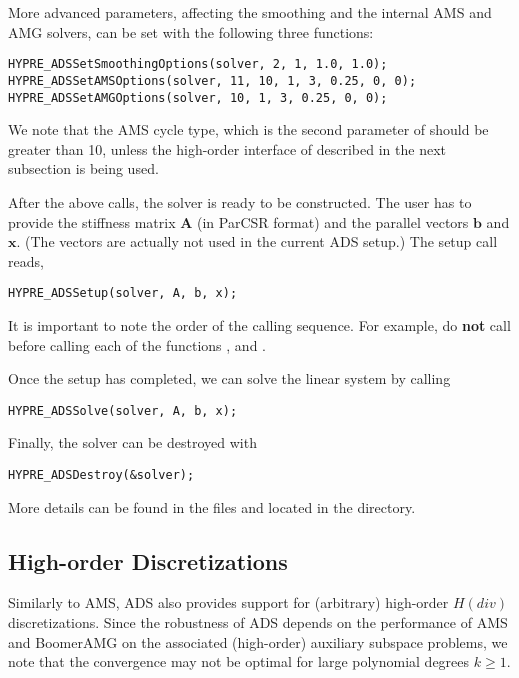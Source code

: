 More advanced parameters, affecting the smoothing and the internal AMS and AMG
 solvers, can be set with the following three functions:
\begin{display}\begin{verbatim}
HYPRE_ADSSetSmoothingOptions(solver, 2, 1, 1.0, 1.0);
HYPRE_ADSSetAMSOptions(solver, 11, 10, 1, 3, 0.25, 0, 0);
HYPRE_ADSSetAMGOptions(solver, 10, 1, 3, 0.25, 0, 0);
\end{verbatim}\end{display}
We note that the AMS cycle type, which is the second parameter of
 should be greater than 10, unless the high-order
interface of  described in the next subsection
is being used.

After the above calls, the solver is ready to be constructed.  The user has to
provide the stiffness matrix ${\mathbf A}$ (in ParCSR format) and the \hypre{}
parallel vectors ${\mathbf b}$ and ${\mathbf x}$. (The vectors are actually not
used in the current ADS setup.) The setup call reads,
\begin{display}\begin{verbatim}
HYPRE_ADSSetup(solver, A, b, x);
\end{verbatim}\end{display}
It is important to note the order of the calling sequence. For example, do {\bf not}
call  before calling each of the functions 
, 
and .

\noindent
Once the setup has completed, we can solve the linear system by calling
\begin{display}\begin{verbatim}
HYPRE_ADSSolve(solver, A, b, x);
\end{verbatim}\end{display}

\noindent
Finally, the solver can be destroyed with
\begin{display}\begin{verbatim}
HYPRE_ADSDestroy(&solver);
\end{verbatim}\end{display}

\noindent
More details can be found in the files  and 
located in the  directory.

\subsection{High-order Discretizations}
Similarly to AMS, ADS also provides support for (arbitrary) high-order $H(div)$
discretizations. Since the robustness of ADS depends on the performance of AMS
and BoomerAMG on the associated (high-order) auxiliary subspace problems, we
note that the convergence may not be optimal for large polynomial degrees $k
\geq 1$.

